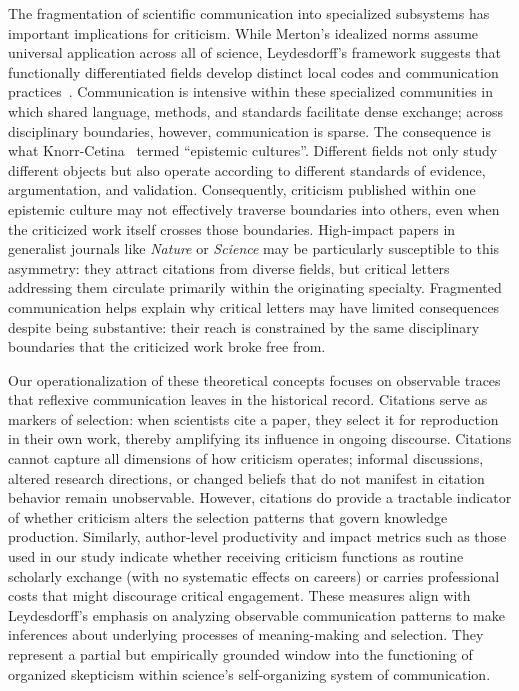 \documentclass[12pt]{article} %
\begin{document}
The fragmentation of scientific communication into specialized subsystems has important implications for criticism. 
While Merton's idealized norms assume universal application across all of science, Leydesdorff's framework suggests that functionally differentiated fields develop distinct local codes and communication practices~\cite{leydesdorff2001sociological}. 
Communication is intensive within these specialized communities in which shared language, methods, and standards facilitate dense exchange; across disciplinary boundaries, however, communication is sparse. 
The consequence is what Knorr-Cetina~\cite{knorr1999epistemic} termed ``epistemic cultures''. Different fields not only study different objects but also operate according to different standards of evidence, argumentation, and validation. 
Consequently, criticism published within one epistemic culture may not effectively traverse boundaries into others, even when the criticized work itself crosses those boundaries. High-impact papers in generalist journals like \textit{Nature} or \textit{Science} may be particularly susceptible to this asymmetry: they attract citations from diverse fields, but critical letters addressing them circulate primarily within the originating specialty. 
Fragmented communication helps explain why critical letters may have limited consequences despite being substantive: their reach is constrained by the same disciplinary boundaries that the criticized work broke free from.

Our operationalization of these theoretical concepts focuses on observable traces that reflexive communication leaves in the historical record. Citations serve as markers of selection: when scientists cite a paper, they select it for reproduction in their own work, thereby amplifying its influence in ongoing discourse.
Citations cannot capture all dimensions of how criticism operates; informal discussions, altered research directions, or changed beliefs that do not manifest in citation behavior remain unobservable.
However, citations do provide a tractable indicator of whether criticism alters the selection patterns that govern knowledge production. 
Similarly, author-level productivity and impact metrics such as those used in our study indicate whether receiving criticism functions as routine scholarly exchange (with no systematic effects on careers) or carries professional costs that might discourage critical engagement.
These measures align with Leydesdorff's emphasis on analyzing observable communication patterns to make inferences about underlying processes of meaning-making and selection. 
They represent a partial but empirically grounded window into the functioning of organized skepticism within science's self-organizing system of communication.
\end{document}
